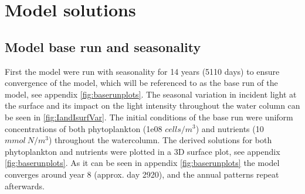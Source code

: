 \chapter{Model solutions}
\section{Model base run and seasonality}
First the model were run with seasonality for 14 years (5110 days) to ensure convergence of the model, which will be referenced to as the base run of the model, see appendix \cref{fig:baserunplots}. The seasonal variation in incident light at the surface and its impact on the light intensity throughout the water column can be seen in \cref{fig:IandIsurfVar}.  
The initial conditions of the base run were uniform concentrations of both phytoplankton (1e08 $cells/m^3$) and nutrients (10 $mmol \: N/m^3$) throughout the watercolumn.
The derived solutions for both phytoplankton and nutrients were plotted in a 3D surface plot, see appendix \cref{fig:baserunplots}.
As it can be seen in appendix \cref{fig:baserunplots} the model converges around year 8 (approx. day 2920), and the annual patterns repeat afterwards.

